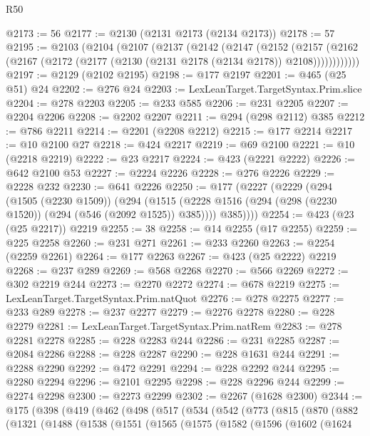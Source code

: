 \begin{lexlean}{R50}
\begin{coremodule}
@2173 := 56
@2177 := @2130 (@2131 @2173 (@2134 @2173))
@2178 := 57
@2195 := @2103
    (@2104
      (@2107
        (@2137
          (@2142
            (@2147
              (@2152
                (@2157
                  (@2162 (@2167 (@2172 (@2177 (@2130 (@2131 @2178 (@2134 @2178)) @2108))))))))))))
@2197 := @2129 (@2102 @2195)
@2198 := @177 @2197
@2201 := @465 (@25 @51) @24
@2202 := @276 @24
@2203 := LexLeanTarget.TargetSyntax.Prim.slice
@2204 := @278 @2203
@2205 := @233 @585
@2206 := @231 @2205
@2207 := @2204 @2206
@2208 := @2202 @2207
@2211 := @294 (@298 @2112) @385
@2212 := @786 @2211
@2214 := @2201 (@2208 @2212)
@2215 := @177 @2214
@2217 := @10 @2100 @27
@2218 := @424 @2217
@2219 := @69 @2100
@2221 := @10 (@2218 @2219)
@2222 := @23 @2217
@2224 := @423 (@2221 @2222)
@2226 := @642 @2100 @53
@2227 := @2224 @2226
@2228 := @276 @2226
@2229 := @2228 @232
@2230 := @641 @2226
@2250 := @177
    (@2227
      (@2229
        (@294
          (@1505 (@2230 @1509))
          (@294
            (@1515 (@2228 @1516 (@294 (@298 (@2230 @1520)) (@294 (@546 (@2092 @1525)) @385))))
            @385))))
@2254 := @423 (@23 (@25 @2217)) @2219
@2255 := 38
@2258 := @14 @2255 (@17 @2255)
@2259 := @225 @2258
@2260 := @231 @271
@2261 := @233 @2260
@2263 := @2254 (@2259 @2261)
@2264 := @177 @2263
@2267 := @423 (@25 @2222) @2219
@2268 := @237 @289
@2269 := @568 @2268
@2270 := @566 @2269
@2272 := @302 @2219 @244
@2273 := @2270 @2272
@2274 := @678 @2219
@2275 := LexLeanTarget.TargetSyntax.Prim.natQuot
@2276 := @278 @2275
@2277 := @233 @289
@2278 := @237 @2277
@2279 := @2276 @2278
@2280 := @228 @2279
@2281 := LexLeanTarget.TargetSyntax.Prim.natRem
@2283 := @278 @2281 @2278
@2285 := @228 @2283 @244
@2286 := @231 @2285
@2287 := @2084 @2286
@2288 := @228 @2287
@2290 := @228 @1631 @244
@2291 := @2288 @2290
@2292 := @472 @2291
@2294 := @228 @2292 @244
@2295 := @2280 @2294
@2296 := @2101 @2295
@2298 := @228 @2296 @244
@2299 := @2274 @2298
@2300 := @2273 @2299
@2302 := @2267 (@1628 @2300)
@2344 := @175
    (@398
      (@419
        (@462
          (@498
            (@517
              (@534
                (@542
                  (@773
                    (@815
                      (@870
                        (@882
                          (@1321
                            (@1488
                              (@1538
                                (@1551
                                  (@1565
                                    (@1575
                                      (@1582
                                        (@1596
                                          (@1602
                                            (@1624

\end{coremodule}
\end{lexlean}
